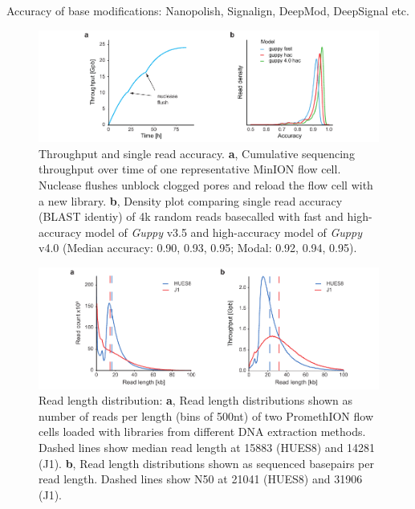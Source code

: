 Accuracy of base modifications: Nanopolish, Signalign, DeepMod, DeepSignal etc.


\begin{figure}[h]
    \centering
    \includegraphics[width=1.0\textwidth]{figures/state_of_art/throughput.pdf}
    \captionsetup{format=plain}
    \caption[Throughput and accuracy]{Throughput and single read accuracy. \textbf{a}, Cumulative sequencing throughput over time of one representative MinION flow cell. Nuclease flushes unblock clogged pores and reload the flow cell with a new library. \textbf{b}, Density plot comparing single read accuracy (BLAST identiy) of 4k random reads basecalled with fast and high-accuracy model of \textit{Guppy} v3.5 and high-accuracy model of \textit{Guppy} v4.0 (Median accuracy: 0.90, 0.93, 0.95; Modal: 0.92, 0.94, 0.95).}
    \label{fig:state_of_art:throughput}
\end{figure}

\begin{figure}[h]
    \centering
    \includegraphics[width=1.0\textwidth]{figures/state_of_art/read_length.pdf}
    \captionsetup{format=plain}
    \caption[Read length median and N50]{Read length distribution: \textbf{a}, Read length distributions shown as number of reads per length (bins of 500nt) of two PromethION flow cells loaded with libraries from different DNA extraction methods. Dashed lines show median read length at 15883 (HUES8) and 14281 (J1). \textbf{b}, Read length distributions shown as sequenced basepairs per read length. Dashed lines show N50 at 21041 (HUES8) and 31906 (J1).}
    \label{fig:state_of_art:read_length}
\end{figure}

